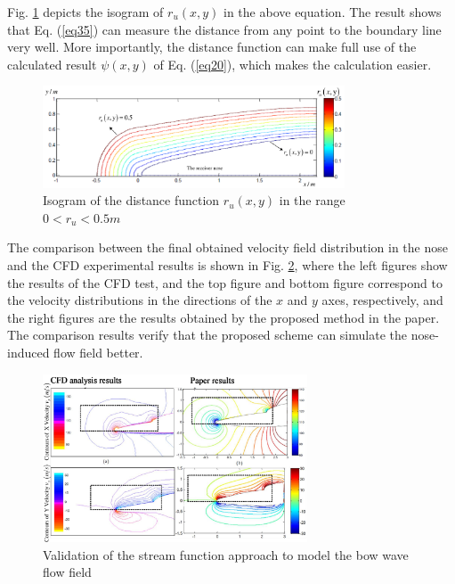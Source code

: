 Fig. \ref{fig7} depicts the isogram of $r_u(x,y)$ in the above equation. The result shows that Eq. (\ref{eq35}) can measure the distance from any point to the boundary line very well. More importantly, the distance function can make full use of the calculated result $\psi(x,y)$ of Eq. (\ref{eq20}), which makes the calculation easier.\clearpage
\begin{figure}[th]
	\centering
	\includegraphics[width=0.8\textwidth]{Figures/Figs_Ch4/fig7.pdf}
	\caption{Isogram of the distance function $r_u(x,y)$ in the range $0<r_u<0.5m$}\label{fig7}
\end{figure}

The comparison between the final obtained velocity field distribution in the nose and the CFD experimental results is shown in Fig. \ref{fig8}, where the left figures show the results of the CFD test, and the top figure and bottom figure correspond to the velocity distributions in the directions of the $x$ and $y$ axes, respectively, and the right figures are the results obtained by the proposed method in the paper. The comparison results verify that the proposed scheme can simulate the nose-induced flow field better.
\begin{figure}[th]
	\centering
	\includegraphics[width=0.7\textwidth]{Figures/Figs_Ch4/fig8.pdf}
	\caption{Validation of the stream function approach to model the bow wave flow field}\label{fig8}
\end{figure}
